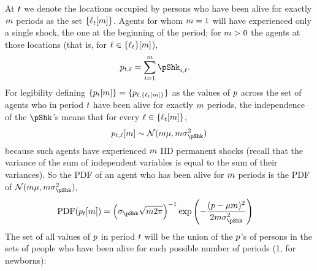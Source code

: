 \documentclass[../BufferStockTheory.tex]{subfiles}\usepackage{ApndxSteadyState}
\begin{document}
  At ${}t$ we denote the locations occupied by persons who have been alive for exactly $m$ periods as the set $\{\ell_{{}t}[m]\}$. Agents for whom $m=1$ will have experienced only a single shock, the one at the beginning of the period; for $m>0$ the agents at those locations (that is, for $\ell \in \{\ell_{{}t}\}[m]$),
  \begin{align}
    \pLog_{{\tp}\FutPer,\posn}  & = \sum_{\NewPer=1}^{\LooPer}\pShk_{{\tp}\NewPer,\posn}.
  \end{align}
  For legibility defining $\{p_{{}t}[m]\} = \{p_{{}t,\{\ell_{{}t}[m]\}}\}$ as the values of $p$ across the set of agents who in period ${}t$ have been alive for exactly $m$ periods, the independence of the $\pShk$'s means that for every $\ell \in \{\ell_{t}[m]\}$,
  \begin{align}
    \pLog_{\FutPer,\posn}[\LooPer] \sim \mathcal{N}(\LooPer \pShkMean,\LooPer \sigma^{2}_{\pShk}) \label{eq:dstpnm}
  \end{align}
  because such agents have experienced $m$ IID permanent shocks (recall that the variance of the sum of independent variables is equal to the sum of their variances).
  \newcommand{\PDF}{\textrm{PDF}}
  So the PDF of an agent who has been alive for $m$ periods is the PDF of $\mathcal{N}(\LooPer \pShkMean,\LooPer \sigma^{2}_{\pShk}),$
  \begin{align}
    \PDF(\pLog_{\FutPer}[\LooPer]) & = \left(
                                     {\sigma_{\pShk}\sqrt{\LooPer 2 \pi}}\right)^{-1} \exp\left(-\frac{(\pLog- \pShkMean \LooPer )^{2}}{2 \LooPer \sigma^{2}_{\pShk}}\right)
  \end{align}
  \newpage
  The set of all values of $p$ in period $t$ will be the union of the $p$'s of persons in the sets of people who have been alive for each possible number of periods (1, for newborns):
\end{document}
